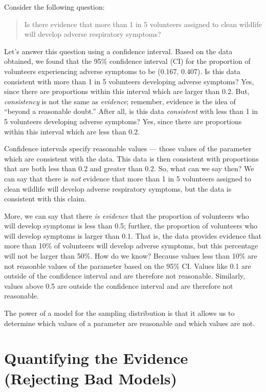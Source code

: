 \documentclass[]{book}
\theoremstyle{definition}
\theoremstyle{definition}
\theoremstyle{remark}
\begin{document}
Consider the following question:

\begin{quote}
Is there evidence that more than 1 in 5 volunteers assigned to clean
wildlife will develop adverse respiratory symptoms?
\end{quote}

Let's answer this question using a confidence interval. Based on the
data obtained, we found that the 95\% confidence interval (CI) for the
proportion of volunteers experiencing adverse symptoms to be (0.167,
0.407). Is this data consistent with more than 1 in 5 volunteers
developing adverse symptoms? Yes, since there are proportions within
this interval which are larger than 0.2. But, \emph{consistency} is not
the same as \emph{evidence}; remember, evidence is the idea of ``beyond
a reasonable doubt.'' After all, is this data \emph{consistent} with
less than 1 in 5 volunteers developing adverse symptoms? Yes, since
there are proportions within this interval which are less than 0.2.

Confidence intervals specify reasonable values --- those values of the
parameter which are consistent with the data. This data is then
consistent with proportions that are both less than 0.2 and greater than
0.2. So, what can we say then? We can say that there is \emph{not}
evidence that more than 1 in 5 volunteers assigned to clean wildlife
will develop adverse respiratory symptoms, but the data is consistent
with this claim.

More, we can say that there \emph{is evidence} that the proportion of
volunteers who will develop symptoms is less than 0.5; further, the
proportion of volunteers who will develop symptoms is larger than 0.1.
That is, the data provides evidence that more than 10\% of volunteers
will develop adverse symptoms, but this percentage will not be larger
than 50\%. How do we know? Because values less than 10\% are not
reasonble values of the parameter based on the 95\% CI. Values like 0.1
are outside of the confidence interval and are therefore not reasonable.
Similarly, values above 0.5 are outside the confidence interval and are
therefore not reasonable.

The power of a model for the sampling distribution is that it allows us
to determine which values of a parameter are reasonable and which values
are not.

\chapter{Quantifying the Evidence (Rejecting Bad
Models)}\label{NullDistns}
\end{document}
